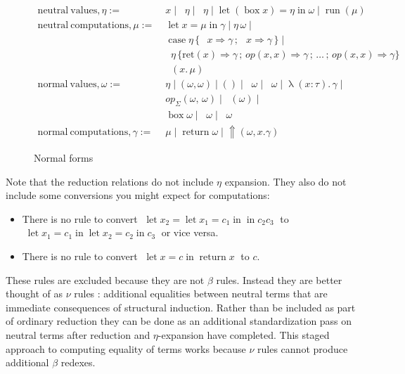 \documentclass[acmsmall, screen, nonacm]{acmart}
\theoremstyle{definition}
\newcommand{\reflectname}{\Uparrow}
\newcommand{\performraw}[2]{\mathop{\reflectname(#1(#2))}}
\newcommand{\perform}[5]{\performraw{#1}{#2}(#3, #4. #5)}
\newcommand{\reifyname}{\Downarrow}
\newcommand{\reifyraw}[1]{\mathop{\reifyname_{#1}}}
\newcommand{\reify}[3]{\reifyraw{#1}(#2.\,#3)}
\newcommand{\outl}[1]{\mathop{\mathrm{out}_L} #1}
\newcommand{\outr}[1]{\mathop{\mathrm{out}_R} #1}
\newcommand{\indintro}[4]{#2_{#1}(#3,\, #4)}
\newcommand{\retname}{\mathrm{ret}}
\newcommand{\ret}[2]{\mathop{\retname_{#1}}(#2)}
\newcommand{\indelim}[3]{\mathop{\mathrm{rec}_{#1}} #2 \,\{#3\}}
\newcommand{\indretcase}[2]{\retname(#1) \Rightarrow #2}
\newcommand{\indcase}[4]{#1(#2, #3) \Rightarrow #4}
\newcommand{\seq}{\,;\,}
\newcommand{\fst}{\mathop{\pi_1}}
\newcommand{\snd}{\mathop{\pi_2}}
\newcommand{\inl}[1]{\mathop{\mathrm{in}_L} #1}
\newcommand{\inr}[1]{\mathop{\mathrm{in}_R} #1}
\newcommand{\case}[5]{\mathop{\mathrm{case}} #1 \,\{\,\inl{#2} \Rightarrow #3 \seq \inr{#4} \Rightarrow #5 \,\}}
\newcommand{\abs}[3]{\mathop{\lambda}(#1 \types #2).\,#3}
\newcommand{\app}[2]{#1\,#2}
\newcommand{\types}{\mathrel{:}}
\newcommand{\return}[1]{\mathop{\mathrm{return}} #1}
\newcommand{\letv}[3]{\mathop{\mathrm{let}} #1 = #2 \mathop{\mathrm{in}} #3}
\newcommand{\gbox}[1]{\mathop{\mathrm{box}} #1}
\newcommand{\gunbox}[3]{\mathop{\mathrm{let}} (\gbox #1) = #2 \mathop{\mathrm{in}} #3}
\newcommand{\grun}[1]{\mathop{\mathrm{run}}(#1)}
\begin{document}
\begin{figure}
\begin{align*}
  \mathrm{neutral\ values}, \eta :=\;& x \mid \fst \eta \mid \snd \eta
                                     \mid \gunbox{x}{\eta}{\omega} \mid \grun{\mu} \\
  \mathrm{neutral\ computations}, \mu :=\;& \letv{x}{\mu}{\gamma}
                                           \mid \app{\eta}{\omega} \mid \\
                                   & \case{\eta}{x}{\gamma}{x}{\gamma} \mid \\
                            & \indelim{\Sigma}{\eta}
                              {\indretcase{x}{\gamma} \seq
                               \indcase{op}{x}{x}{\gamma} \seq \ldots \seq
                               \indcase{op}{x}{x}{\gamma}} \\
                                   & \reify{\Sigma}{x}{\mu} \\
  \mathrm{normal\ values}, \omega :=\;& \eta \mid (\omega, \omega)
                           \mid () \mid \inl{\omega} \mid \inr{\omega} \mid \abs{x}{\tau}{\gamma} \mid \\
                           &\indintro{\Sigma}{op}{\omega}{\omega} \mid \ret{\Sigma}{\omega} \mid \\
                           &\gbox{\omega} \mid \outl{\omega} \mid \outr{\omega} \\
  \mathrm{normal\ computations}, \gamma :=\;& \mu \mid \return{\omega}
                                               \mid \perform{\eta}{op}{\omega}{x}{\gamma}
\end{align*}
\caption{Normal forms}
\label{fig:normal}
\end{figure}

Note that the reduction relations do not include $\eta$ expansion. They
also do not include some conversions you might expect for computations:
\begin{itemize}
\item There is no rule to convert
  $\; \letv{x_2}{\letv{x_1}{c_1}}{c_2}{c_3} \;$ to
  $\; \letv{x_1}{c_1}{\letv{x_2}{c_2}{c_3}} \;$ or vice versa.
\item There is no rule to convert $\; \letv{x}{c}{\return x} \;$ to $c$.
\end{itemize}
These rules are excluded because they are not $\beta$ rules. Instead
they are better thought of as $\nu$ rules \cite{??}: additional
equalities between neutral terms that are immediate consequences of
structural induction. Rather than be included as part of ordinary
reduction they can be done as an additional standardization pass on
neutral terms after reduction and $\eta$-expansion have completed. This
staged approach to computing equality of terms works because $\nu$ rules
cannot produce additional $\beta$ redexes.
\end{document}
